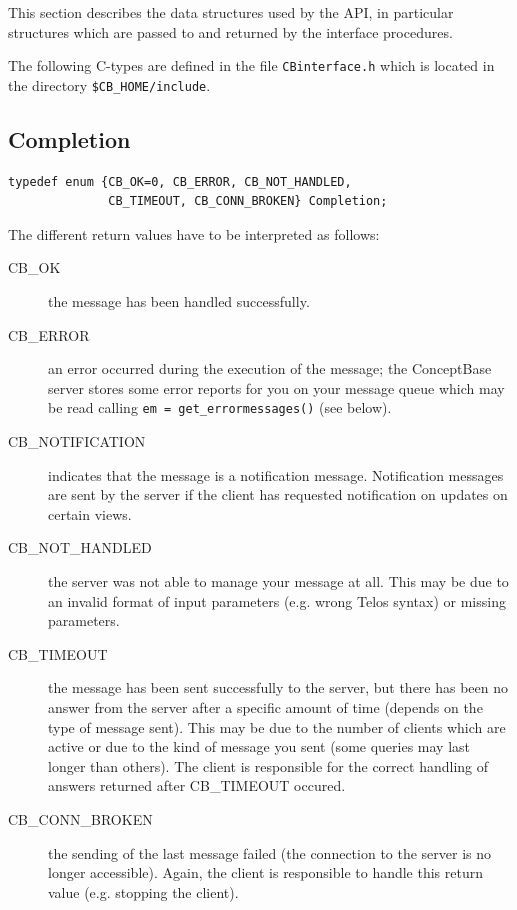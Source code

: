 This section describes the data structures used by the API, in particular
structures which are passed to and returned by the interface procedures.

The following C-types are defined in the file {\tt CBinterface.h}
which is located in the directory \verb+$CB_HOME/include+.


\subsection{Completion}
\label{completion}

\begin{verbatim}
typedef enum {CB_OK=0, CB_ERROR, CB_NOT_HANDLED,
              CB_TIMEOUT, CB_CONN_BROKEN} Completion;
\end{verbatim}

The different return values have to be interpreted as follows:

\begin{description}
\item[CB\_OK] the message has been handled successfully.

\item[CB\_ERROR] an error occurred during the execution of the message; the
  ConceptBase server stores some error reports for you on your message
  queue which may be read calling {\tt em = get\_errormessages()} (see below).

\item[CB\_NOTIFICATION] indicates that the message is a notification message.
Notification messages are sent by the server if the client has requested
notification on updates on certain views.

\item[CB\_NOT\_HANDLED] the server was not able to manage your message at all.
  This may be due to an invalid format of input parameters (e.g. wrong
  Telos syntax) or missing parameters.

\item[CB\_TIMEOUT] the message has been sent successfully to the server,
  but there has been no answer from the server after a specific amount
  of time (depends on the type of message sent). This may be due to
  the number of clients which are active or due to the kind of message
  you sent (some queries may last longer than others). The client is
  responsible for the correct handling of answers returned after
  CB\_TIMEOUT occured.

\item[CB\_CONN\_BROKEN] the sending of the last message failed (the
  connection to the server is no longer accessible). Again, the client
  is responsible to handle this return value (e.g. stopping the
  client).
\end{description}

